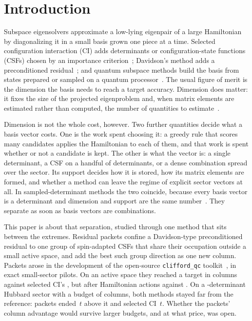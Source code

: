\documentclass[aps,pra,reprint,superscriptaddress,nofootinbib,floatfix,
  showkeys,raggedbottom]{revtex4-2}
\newcommand{\pkg}{\texttt{clifford\_qc}}
\begin{document}
\maketitle

\section{Introduction}
\label{sec:introduction}

Subspace eigensolvers approximate a low-lying eigenpair of a large Hamiltonian
by diagonalizing it in a small basis grown one piece at a time. Selected
configuration interaction (CI) adds determinants or configuration-state
functions (CSFs) chosen by an importance criterion~\cite{huron1973cipsi,
holmes2016hci}; Davidson's method adds a preconditioned
residual~\cite{davidson1975iterative}; and quantum subspace methods build the
basis from states prepared or sampled on a quantum
processor~\cite{mcclean2017qse,stair2020krylov,kanno2026qsci,
robledomoreno2025sqd}. The usual figure of merit is the dimension the basis
needs to reach a target accuracy. Dimension does matter: it fixes the size of
the projected eigenproblem and, when matrix elements are estimated rather than
computed, the number of quantities to estimate~\cite{epperly2022theory,
lee2024sampling}.

Dimension is not the whole cost, however. Two further quantities decide what
a basis vector costs. One is the work spent choosing it: a greedy rule that
scores many candidates applies the Hamiltonian to each of them, and that work
is spent whether or not a candidate is kept. The other is what the vector is:
a single determinant, a CSF on a handful of determinants, or a dense
combination spread over the sector. Its support decides how it is stored, how
its matrix elements are formed, and whether a method can leave the regime of
explicit sector vectors at all. In sampled-determinant methods the two
coincide, because every basis vector is a determinant and dimension and
support are the same number~\cite{kanno2026qsci,robledomoreno2025sqd}. They
separate as soon as basis vectors are combinations.

This paper is about that separation, studied through one method that sits
between the extremes. Residual packets confine a Davidson-type preconditioned
residual to one group of spin-adapted CSFs that share their occupation outside
a small active space, and add the best such group direction as one new column.
Packets arose in the development of the open-source \pkg{}
toolkit~\cite{utama2026architecture}, in exact small-sector pilots. On an
\pkWaterName{} active space they reached a \pkTightTarget{} target
in \pkWaterPacketColumns{} columns against selected CI's
\pkWaterSciColumns{}, but after \pkWaterPacketActions{} Hamiltonian actions
against \pkWaterSciActions{}. On a \pkPrimaryDeterminants{}-determinant Hubbard
sector with a budget of \pkLargeBudget{} columns, both methods stayed far from
the reference: packets ended \pkLargePacketsError{}\,$t$ above it and selected
CI \pkLargeSciError{}\,$t$. Whether the packets' column advantage would survive
larger budgets, and at what price, was open.
\end{document}
